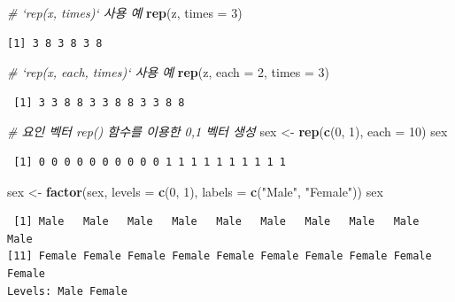 \documentclass[11pt,a4paper]{book}
\newenvironment{Shaded}{\begin{snugshade}}{\end{snugshade}}
\newcommand{\KeywordTok}[1]{\textcolor[rgb]{0.13,0.29,0.53}{\textbf{#1}}}
\newcommand{\DataTypeTok}[1]{\textcolor[rgb]{0.13,0.29,0.53}{#1}}
\newcommand{\DecValTok}[1]{\textcolor[rgb]{0.00,0.00,0.81}{#1}}
\newcommand{\StringTok}[1]{\textcolor[rgb]{0.31,0.60,0.02}{#1}}
\newcommand{\CommentTok}[1]{\textcolor[rgb]{0.56,0.35,0.01}{\textit{#1}}}
\newcommand{\NormalTok}[1]{#1}
\theoremstyle{definition}
\theoremstyle{definition}
\theoremstyle{definition}
\theoremstyle{remark}
\begin{document}
\begin{Shaded}
\begin{Highlighting}[]
\CommentTok{# `rep(x, times)` 사용 예}
\KeywordTok{rep}\NormalTok{(z, }\DataTypeTok{times =} \DecValTok{3}\NormalTok{)}
\end{Highlighting}
\end{Shaded}

\begin{verbatim}
[1] 3 8 3 8 3 8
\end{verbatim}

\begin{Shaded}
\begin{Highlighting}[]
\CommentTok{# `rep(x, each, times)` 사용 예}
\KeywordTok{rep}\NormalTok{(z, }\DataTypeTok{each =} \DecValTok{2}\NormalTok{, }\DataTypeTok{times =} \DecValTok{3}\NormalTok{)}
\end{Highlighting}
\end{Shaded}

\begin{verbatim}
 [1] 3 3 8 8 3 3 8 8 3 3 8 8
\end{verbatim}

\begin{Shaded}
\begin{Highlighting}[]
\CommentTok{# 요인 벡터 rep() 함수를 이용한 0,1 벡터 생성}
\NormalTok{sex <-}\StringTok{ }\KeywordTok{rep}\NormalTok{(}\KeywordTok{c}\NormalTok{(}\DecValTok{0}\NormalTok{, }\DecValTok{1}\NormalTok{), }\DataTypeTok{each =} \DecValTok{10}\NormalTok{)}
\NormalTok{sex}
\end{Highlighting}
\end{Shaded}

\begin{verbatim}
 [1] 0 0 0 0 0 0 0 0 0 0 1 1 1 1 1 1 1 1 1 1
\end{verbatim}

\begin{Shaded}
\begin{Highlighting}[]
\NormalTok{sex <-}\StringTok{ }\KeywordTok{factor}\NormalTok{(sex, }\DataTypeTok{levels =} \KeywordTok{c}\NormalTok{(}\DecValTok{0}\NormalTok{, }\DecValTok{1}\NormalTok{), }\DataTypeTok{labels =} \KeywordTok{c}\NormalTok{(}\StringTok{"Male"}\NormalTok{, }\StringTok{"Female"}\NormalTok{))}
\NormalTok{sex}
\end{Highlighting}
\end{Shaded}

\begin{verbatim}
 [1] Male   Male   Male   Male   Male   Male   Male   Male   Male   Male  
[11] Female Female Female Female Female Female Female Female Female Female
Levels: Male Female
\end{verbatim}
\end{document}
